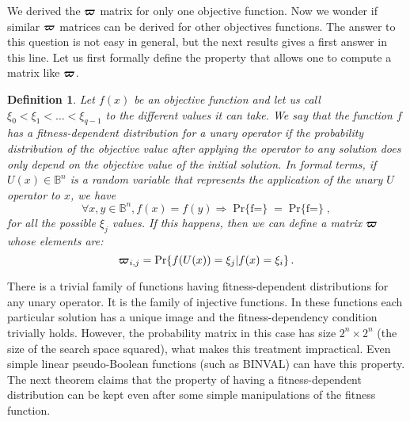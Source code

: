 \documentclass{article}
\newtheorem{definition}{Definition}
\def\vec#1{\mathchoice{\mbox{\boldmath$\displaystyle#1$}}
  {\mbox{\boldmath$\textstyle#1$}}
  {\mbox{\boldmath$\scriptstyle#1$}}
  {\mbox{\boldmath$\scriptscriptstyle#1$}}}
\newcommand{\Bo}[0]{\mathbb{B}}
\newcommand{\Prob}[1]{\mathop{\mathrm{Pr}\{#1\}}}
\newcommand{\ProbCond}[2]{\mathop{\mathrm{Pr}\{#1|#2\}}}
\begin{document}
We derived the $\vec{\varpi}$ matrix for only one objective function. Now we wonder if similar $\vec{\varpi}$ matrices can be derived for other objectives functions. The answer to this question is not easy in general, but the next results gives a first answer in this line. Let us first formally define the property that allows one to compute a matrix like $\vec{\varpi}$.

\begin{definition}
Let $f(x)$ be an objective function and let us call $\xi_0 < \xi_1 < \ldots < \xi_{q-1}$ to the different values it can take. We say that the function $f$ \emph{has a fitness-dependent distribution} for a unary operator if the probability distribution of the objective value after applying the operator to any solution does only depend on the objective value of the initial solution. In formal terms, if $U(x) \in \Bo^n$ is a random variable that represents the application of the unary $U$ operator to $x$, we have
\begin{equation}
\forall x,y \in \Bo^n, f(x)=f(y) \Rightarrow \Prob{f(U(x))=\xi_j} = \Prob{f(U(y))=\xi_j} ,
\end{equation}
for all the possible $\xi_j$ values. If this happens, then we can define a matrix $\vec{\varpi}$ whose elements are:
\begin{equation}
\vec{\varpi}_{i,j} = \ProbCond{f(U(x))=\xi_j}{f(x)=\xi_i} .
\end{equation}
\end{definition}

There is a trivial family of functions having fitness-dependent distributions for any unary operator. It is the family of injective functions. In these functions each particular solution has a unique image and the fitness-dependency condition trivially holds. However, the probability matrix in this case has size $2^n \times 2^n$ (the size of the search space squared), what makes this treatment impractical. Even simple linear pseudo-Boolean functions (such as BINVAL) can have this property. 
The next theorem claims that the property of having a fitness-dependent distribution can be kept even after some simple manipulations of the fitness function.
\end{document}
